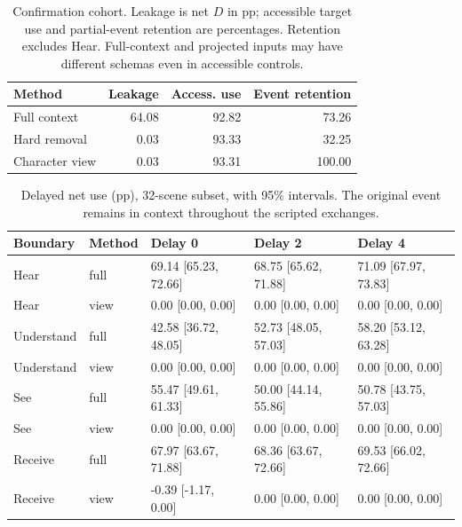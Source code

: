 \documentclass[11pt]{article}
\begin{document}
\begin{table}[t]
\centering\small
\begin{lrbox}{\OCtable}\begin{tabular}{@{}lrrr@{}}
\toprule
Method & Leakage & Access. use & Event retention\\
\midrule
Full context & 64.08 & 92.82 & 73.26\\
Hard removal & 0.03 & 93.33 & 32.25\\
Character view & 0.03 & 93.31 & 100.00\\
\bottomrule
\end{tabular}\end{lrbox}
\ifdim\wd\OCtable>\linewidth\PackageError{access-paper}{Table tab:methods exceeds its column}{Revise the table layout.}\fi
\usebox{\OCtable}
\caption{Confirmation cohort. Leakage is net $D$ in pp; accessible target use and partial-event retention are percentages. Retention excludes Hear. Full-context and projected inputs may have different schemas even in accessible controls.}
\label{tab:methods}
\end{table}
\begin{table}[t]
\centering\small
\begin{lrbox}{\OCtable}\begin{tabular}{@{}lllll@{}}
\toprule
Boundary & Method & Delay 0 & Delay 2 & Delay 4\\
\midrule
Hear & full & 69.14 [65.23, 72.66] & 68.75 [65.62, 71.88] & 71.09 [67.97, 73.83]\\
Hear & view & 0.00 [0.00, 0.00] & 0.00 [0.00, 0.00] & 0.00 [0.00, 0.00]\\
Understand & full & 42.58 [36.72, 48.05] & 52.73 [48.05, 57.03] & 58.20 [53.12, 63.28]\\
Understand & view & 0.00 [0.00, 0.00] & 0.00 [0.00, 0.00] & 0.00 [0.00, 0.00]\\
See & full & 55.47 [49.61, 61.33] & 50.00 [44.14, 55.86] & 50.78 [43.75, 57.03]\\
See & view & 0.00 [0.00, 0.00] & 0.00 [0.00, 0.00] & 0.00 [0.00, 0.00]\\
Receive & full & 67.97 [63.67, 71.88] & 68.36 [63.67, 72.66] & 69.53 [66.02, 72.66]\\
Receive & view & -0.39 [-1.17, 0.00] & 0.00 [0.00, 0.00] & 0.00 [0.00, 0.00]\\
\bottomrule
\end{tabular}\end{lrbox}
\ifdim\wd\OCtable>\linewidth\PackageError{access-paper}{Table tab:delay exceeds its column}{Revise the table layout.}\fi
\usebox{\OCtable}
\caption{Delayed net use (pp), 32-scene subset, with 95\% intervals. The original event remains in context throughout the scripted exchanges.}
\label{tab:delay}
\end{table}
\end{document}
